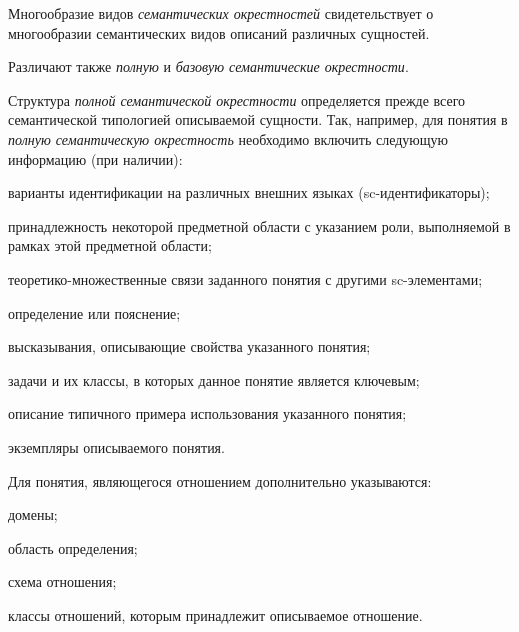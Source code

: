 \bigskip
Многообразие видов \textit{семантических окрестностей} свидетельствует о многообразии семантических видов описаний различных сущностей.


Различают также \textit{полную} и \textit{базовую семантические окрестности}.

\begin{SCn}
\end{SCn}

\bigskip
Структура \textit{полной семантической окрестности} определяется прежде всего семантической типологией описываемой сущности. Так, например, для понятия в \textit{полную семантическую окрестность} необходимо включить следующую информацию (при наличии):
\begin{textitemize}
	\item{варианты идентификации на различных внешних языках (sc-идентификаторы)};
	\item{принадлежность некоторой предметной области с указанием роли, выполняемой в рамках этой предметной области};
	\item{теоретико-множественные связи заданного понятия с другими sc-элементами};
	\item{определение или пояснение};
	\item{высказывания, описывающие свойства указанного понятия};
	\item{задачи и их классы, в которых данное понятие является ключевым};
	\item{описание типичного примера использования указанного понятия};
	\item{экземпляры описываемого понятия}.
\end{textitemize}

Для понятия, являющегося отношением дополнительно указываются:

\begin{textitemize}
	\item{домены};
	\item{область определения};
	\item{схема отношения};
	\item{классы отношений, которым принадлежит описываемое отношение}.
\end{textitemize}

\begin{SCn}
\end{SCn}

